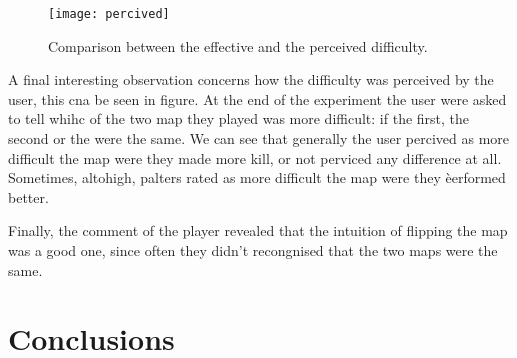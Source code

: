 \begin{figure}
 	\centering
	\texttt{[image: percived]}
	\caption{Comparison between the effective and the perceived difficulty.}
	\label{img:percived}		
\end{figure}

A final interesting observation concerns how the difficulty was perceived by the user, this cna be seen in figure. At the end of the experiment the user were asked to tell whihc of the two map they played was more difficult: if the first, the second or the were the same. We can see that generally the user percived as more difficult the map were they made more kill, or not perviced any difference at all. Sometimes, altohigh, palters rated as more difficult the map were they èerformed better.

\par

Finally, the comment of the player revealed that the intuition of flipping the map was a good one, since often they didn't recongnised that the two maps were the same.


\section{Conclusions}

